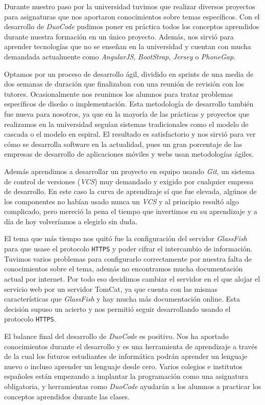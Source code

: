 
Durante nuestro paso por la universidad tuvimos que realizar diversos proyectos para asignaturas que nos aportaron conocimientos sobre temas específicos. Con el desarrollo de \textit{DuoCode} pudimos poner en práctica todos los conceptos aprendidos durante nuestra formación en un único proyecto.
%
Además, nos sirvió para aprender tecnologías que no se enseñan en la universidad y cuentan con mucha demandada actualmente como \textit{AngularJS}, \textit{BootStrap}, \textit{Jersey} o \textit{PhoneGap}.

Optamos por un proceso de desarrollo ágil, dividido en sprints de una media de dos semanas de duración que finalizaban con una reunión de revisión con los tutores. Ocasionalmente nos reunimos los alumnos para tratar problemas específicos de diseño o implementación. Esta metodología de desarrollo también fue nueva para nosotros, ya que en la mayoría de las prácticas y proyectos que realizamos en la universidad seguían sistemas tradicionales como el modelo de cascada o el modelo en espiral. El resultado es satisfactorio y nos sirvió para ver cómo se desarrolla software en la actualidad, pues un gran porcentaje de las empresas de desarrollo de aplicaciones móviles y webs usan metodologías ágiles.

Además aprendimos a desarrollar un proyecto en equipo usando \textit{Git}, un sistema de control de versiones (\textit{VCS}) muy demandado y exigido por cualquier empresa de desarrollo. En este caso la curva de aprendizaje sí que fue elevada, algúnos de los componentes no habían usado nunca un \textit{VCS} y al principio resultó algo complicado, pero mereció la pena el tiempo que invertimos en su aprendizaje y a día de hoy volveríamos a elegirlo sin duda.

El tema que más tiempo nos quitó fue la configuración del servidor \textit{GlassFish} para que usase el protocolo \texttt{HTTPS} y poder cifrar el intercambio de información. Tuvimos varios problemas para configurarlo correctamente por nuestra falta de conocimientos sobre el tema, además no encontramos mucha documentación actual por internet. Por todo eso decidimos cambiar el servidor en el que alojar el servicio web por un servidor TomCat, ya que cuenta con las mismas características que \textit{GlassFish} y hay mucha más documentación online. Esta decisión supuso un acierto y nos permitió seguir desarrollando usando el protocolo \texttt{HTTPS}.

El balance final del desarrollo de \textit{DuoCode} es positivo. Nos ha aportado conocimientos durante el desarrollo y es una herramienta de aprendizaje a través de la cual los futuros estudiantes de informática podrán aprender un lenguaje nuevo o incluso aprender un lenguaje desde cero.
Varios colegios e institutos españoles están empezando a implantar la programación como una asignatura obligatoria, y herramientas como \textit{DuoCode} ayudarán a los alumnos a practicar los conceptos aprendidos durante las clases.